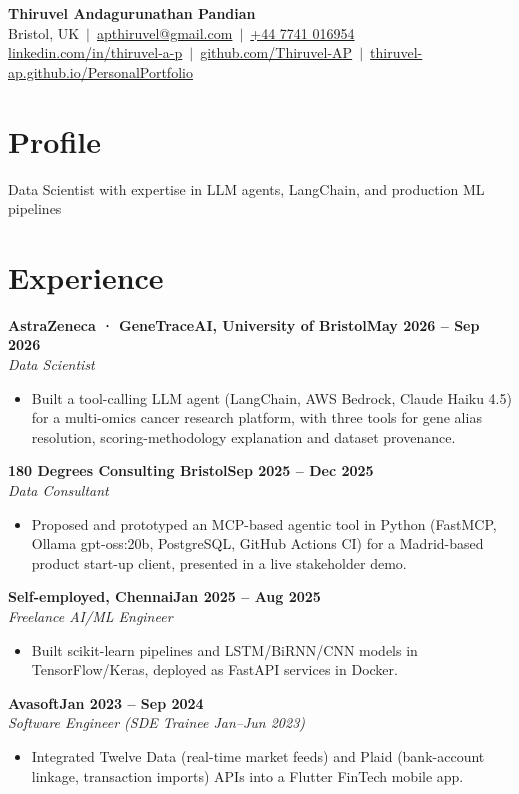 \documentclass[a4paper,10pt]{article}
\newcommand{\entry}[4]{\noindent\textbf{#1}\hfill\textbf{#2}\\ \textit{#3}\hfill\textit{#4}\par}
\begin{document}
\fontsize{10.5}{12.6}\selectfont

\begin{center}
  {\LARGE\bfseries Thiruvel Andagurunathan Pandian}\\[3pt]
  Bristol, UK \,$|$\, \href{mailto:apthiruvel@gmail.com}{apthiruvel@gmail.com} \,$|$\, \href{tel:+447741016954}{+44 7741 016954}\\[1pt]
\href{https://www.linkedin.com/in/thiruvel-a-p/}{linkedin.com/in/thiruvel-a-p} \,$|$\, \href{https://github.com/Thiruvel-AP}{github.com/Thiruvel-AP} \,$|$\, \href{https://thiruvel-ap.github.io/PersonalPortfolio/}{thiruvel-ap.github.io/PersonalPortfolio}
\end{center}

\section{Profile}
Data Scientist with expertise in LLM agents, LangChain, and production ML pipelines

\section{Experience}
\entry{AstraZeneca · GeneTraceAI, University of Bristol}{May 2026 – Sep 2026}{Data Scientist}{}
\begin{itemize}
  \item Built a tool-calling LLM agent (LangChain, AWS Bedrock, Claude Haiku 4.5) for a multi-omics cancer research platform, with three tools for gene alias resolution, scoring-methodology explanation and dataset provenance.
\end{itemize}
\vspace{3pt}
\entry{180 Degrees Consulting Bristol}{Sep 2025 – Dec 2025}{Data Consultant}{}
\begin{itemize}
  \item Proposed and prototyped an MCP-based agentic tool in Python (FastMCP, Ollama gpt-oss:20b, PostgreSQL, GitHub Actions CI) for a Madrid-based product start-up client, presented in a live stakeholder demo.
\end{itemize}
\vspace{3pt}
\entry{Self-employed, Chennai}{Jan 2025 – Aug 2025}{Freelance AI/ML Engineer}{}
\begin{itemize}
  \item Built scikit-learn pipelines and LSTM/BiRNN/CNN models in TensorFlow/Keras, deployed as FastAPI services in Docker.
\end{itemize}
\vspace{3pt}
\entry{Avasoft}{Jan 2023 – Sep 2024}{Software Engineer (SDE Trainee Jan–Jun 2023)}{}
\begin{itemize}
  \item Integrated Twelve Data (real-time market feeds) and Plaid (bank-account linkage, transaction imports) APIs into a Flutter FinTech mobile app.
\end{itemize}
\end{document}
